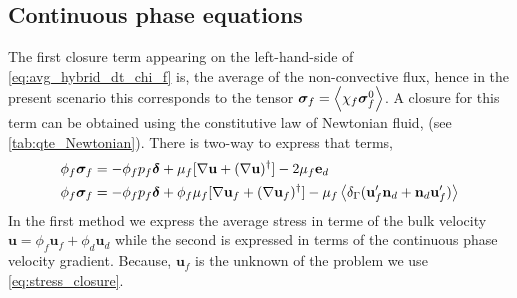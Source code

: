\subsection{Continuous phase equations}
The first closure term appearing on the left-hand-side of \ref{eq:avg_hybrid_dt_chi_f} is, the average of the non-convective flux, hence in the present scenario this corresponds to the tensor $\bm\sigma_f = \left<\chi_f \bm\sigma_f^0\right>$. 
A closure for this term can be obtained using the constitutive law of Newtonian fluid, (see \ref{tab:qte_Newtonian}). 
There  is two-way to express that terms, 
\begin{align}
    \phi_f \bm\sigma_f 
    &=
    - \phi_f p_f \bm\delta
    + \mu_f [\grad \textbf{u}  + (\grad \textbf{u})^\dagger]
    - 2\mu_f \textbf{e}_d
    \\
    \phi_f \bm\sigma_f 
    &=
    - \phi_f p_f \bm\delta
    + \phi_f \mu_f [\grad \textbf{u}_f  + (\grad \textbf{u}_f)^\dagger]
    - \mu_f \avg{\delta_\Gamma( \textbf{u}_f'  \textbf{n}_d +  \textbf{n}_d \textbf{u}_f' )}
    \label{eq:stress_closure}
\end{align}
In the first method we express the average stress in terme of the bulk velocity $\textbf{u} = \phi_f \textbf{u}_f + \phi_d \textbf{u}_d$ while the second is expressed in terms of the continuous phase velocity gradient. 
Because, $\textbf{u}_f$ is the unknown of the problem we use \ref{eq:stress_closure}. 



